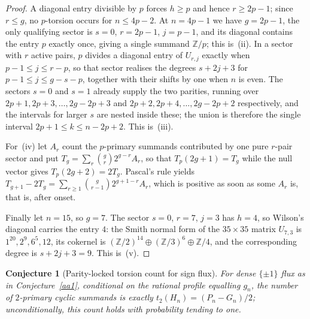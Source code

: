 \documentclass[11pt]{article}
\newtheorem{conjecture}{Conjecture}
\theoremstyle{definition}
\newcommand{\Z}{\mathbb Z}
\providecommand{\Z}{\mathbb Z}
\begin{document}
\begin{proof}
A diagonal entry divisible by $p$ forces $h\ge p$ and hence $r\ge2p-1$; since $r\le g$, no $p$-torsion occurs for $n\le4p-2$.  At $n=4p-1$ we have $g=2p-1$, the only qualifying sector is $s=0$, $r=2p-1$, $j=p-1$, and its diagonal contains the entry $p$ exactly once, giving a single summand $\Z/p$; this is~(ii).  In a sector with $r$ active pairs, $p$ divides a diagonal entry of $U_{r,j}$ exactly when $p-1\le j\le r-p$, so that sector realises the degrees $s+2j+3$ for $p-1\le j\le g-s-p$, together with their shifts by one when $n$ is even.  The sectors $s=0$ and $s=1$ already supply the two parities, running over $2p+1,2p+3,\ldots,2g-2p+3$ and $2p+2,2p+4,\ldots,2g-2p+2$ respectively, and the intervals for larger $s$ are nested inside these; the union is therefore the single interval $2p+1\le k\le n-2p+2$.  This is~(iii).

For~(iv) let $A_r$ count the $p$-primary summands contributed by one pure $r$-pair sector and put $T_g=\sum_r\binom gr2^{g-r}A_r$, so that $T_p(2g+1)=T_g$ while the null vector gives $T_p(2g+2)=2T_g$.  Pascal's rule yields $T_{g+1}-2T_g=\sum_{r\ge1}\binom g{r-1}2^{g+1-r}A_r$, which is positive as soon as some $A_r$ is, that is, after onset.

Finally let $n=15$, so $g=7$.  The sector $s=0$, $r=7$, $j=3$ has $h=4$, so Wilson's diagonal carries the entry $4$: the Smith normal form of the $35\times35$ matrix $U_{7,3}$ is $1^{20},2^{9},6^{5},12$, its cokernel is $(\Z/2)^{14}\oplus(\Z/3)^{6}\oplus\Z/4$, and the corresponding degree is $s+2j+3=9$.  This is~(v).
\end{proof}

\begin{conjecture}[Parity-locked torsion count for sign flux]\label{aa8}
For dense $\{\pm1\}$ flux as in Conjecture~\ref{aa1}, conditional on the rational profile equalling $g_n$, the number of $2$-primary cyclic summands is exactly $t_2(H_n)=(P_n-G_n)/2$; unconditionally, this count holds with probability tending to one.
\end{conjecture}
\end{document}
